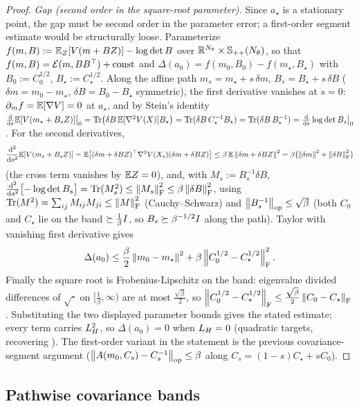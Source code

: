 \begin{proof}
\emph{Gap (second order in the square-root parameter).} Since $a_\star$ is a stationary point, the
gap must be second order in the parameter error; a first-order segment estimate would be structurally
loose. Parameterize $f(m,B):=\mathbb{E}_Z[V(m+BZ)]-\log\det B$ over $\mathbb{R}^{N_\theta}\times\mathbb{S}_{++}(N_\theta)$, so
that $f(m,B)=\mathcal{E}(m,BB^\top)+\text{const}$ and $\Delta(a_0)=f(m_0,B_0)-f(m_\star,B_\star)$ with
$B_0:=C_0^{1/2}$, $B_\star:=C_\star^{1/2}$. Along the affine path $m_s=m_\star+s\,\delta m$,
$B_s=B_\star+s\,\delta B$ ($\delta m=m_0-m_\star$, $\delta B=B_0-B_\star$ symmetric), the first
derivative vanishes at $s=0$: $\partial_mf=\mathbb{E}[\nabla V]=0$ at $a_\star$, and by Stein's identity
$\tfrac{\mathrm{d}}{\mathrm{d} s}\mathbb{E}[V(m_\star+B_sZ)]\big|_0=\operatorname{Tr}\bigl(\delta B\,\mathbb{E}[\nabla^2V(X)]B_\star\bigr)
=\operatorname{Tr}(\delta B\,C_\star^{-1}B_\star)=\operatorname{Tr}(\delta B\,B_\star^{-1})
=\tfrac{\mathrm{d}}{\mathrm{d} s}\log\det B_s\big|_0$. For the second derivatives,
\[
    \frac{\mathrm{d}^2}{\mathrm{d} s^2}\mathbb{E}[V(m_s+B_sZ)]
    =\mathbb{E}\bigl[(\delta m+\delta BZ)^\top\nabla^2V(X_s)(\delta m+\delta BZ)\bigr]
    \leq\beta\,\mathbb{E}\left\lVert \delta m+\delta BZ\right\rVert^2
    =\beta\bigl(\left\lVert \delta m\right\rVert^2+\left\lVert \delta B\right\rVert_{\mathrm{F}}^2\bigr)
\]
(the cross term vanishes by $\mathbb{E} Z=0$), and, with $M_s:=B_s^{-1}\delta B$,
$\tfrac{\mathrm{d}^2}{\mathrm{d} s^2}\bigl[-\log\det B_s\bigr]=\operatorname{Tr}(M_s^2)\leq\left\lVert M_s\right\rVert_{\mathrm{F}}^2\leq\beta\left\lVert \delta B\right\rVert_{\mathrm{F}}^2$,
using $\operatorname{Tr}(M^2)=\sum_{ij}M_{ij}M_{ji}\leq\left\lVert M\right\rVert_{\mathrm{F}}^2$ (Cauchy--Schwarz) and
$\left\lVert B_s^{-1}\right\rVert_{\mathrm{op}}\leq\sqrt\beta$ (both $C_0$ and $C_\star$ lie on the band
$\succeq\tfrac1\beta I$, so $B_s\succeq\beta^{-1/2}I$ along the path). Taylor with vanishing first
derivative gives
\[
    \Delta(a_0)\leq\frac\beta2\left\lVert m_0-m_\star\right\rVert^2+\beta\left\lVert C_0^{1/2}-C_\star^{1/2}\right\rVert_{\mathrm{F}}^2 .
\]
Finally the square root is Frobenius-Lipschitz on the band: eigenvalue divided differences of
$\sqrt{\cdot}$ on $[\tfrac1\beta,\infty)$ are at most $\tfrac{\sqrt\beta}2$, so
$\left\lVert C_0^{1/2}-C_\star^{1/2}\right\rVert_{\mathrm{F}}\leq\tfrac{\sqrt\beta}2\left\lVert C_0-C_\star\right\rVert_{\mathrm{F}}$. Substituting
the two displayed parameter bounds gives the stated estimate; every term carries $L_H^2$, so
$\Delta(a_0)=0$ when $L_H=0$ (quadratic targets, recovering ). The
first-order variant in the statement is the previous covariance-segment argument
($\left\lVert A(m_0,C_s)-C_s^{-1}\right\rVert_{\mathrm{op}}\leq\beta$ along $C_s=(1-s)C_\star+sC_0$).
\end{proof}
\subsection{Pathwise covariance bands}
\label{subsec:bands}

